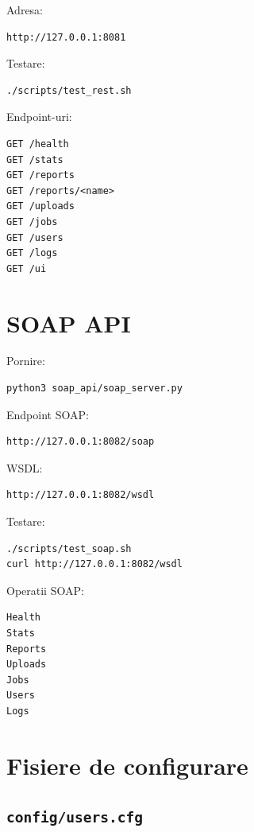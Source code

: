 \documentclass[12pt,a4paper]{article}
\begin{document}
Adresa:

\begin{lstlisting}[style=code]
http://127.0.0.1:8081
\end{lstlisting}

Testare:

\begin{lstlisting}[style=code]
./scripts/test_rest.sh
\end{lstlisting}

Endpoint-uri:

\begin{lstlisting}[style=code]
GET /health
GET /stats
GET /reports
GET /reports/<name>
GET /uploads
GET /jobs
GET /users
GET /logs
GET /ui
\end{lstlisting}

\section{SOAP API}

Pornire:

\begin{lstlisting}[style=code]
python3 soap_api/soap_server.py
\end{lstlisting}

Endpoint SOAP:

\begin{lstlisting}[style=code]
http://127.0.0.1:8082/soap
\end{lstlisting}

WSDL:

\begin{lstlisting}[style=code]
http://127.0.0.1:8082/wsdl
\end{lstlisting}

Testare:

\begin{lstlisting}[style=code]
./scripts/test_soap.sh
curl http://127.0.0.1:8082/wsdl
\end{lstlisting}

Operatii SOAP:

\begin{lstlisting}[style=code]
Health
Stats
Reports
Uploads
Jobs
Users
Logs
\end{lstlisting}

\section{Fisiere de configurare}

\subsection{\texttt{config/users.cfg}}
\end{document}
